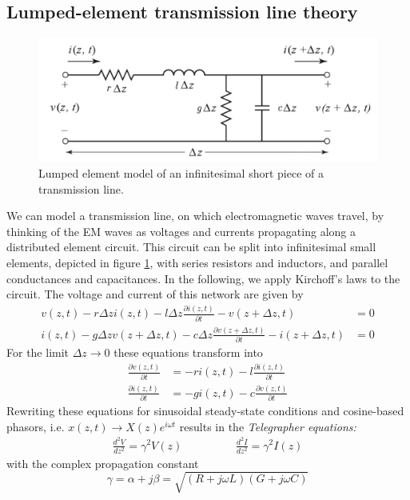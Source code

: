 \subsection{Lumped-element transmission line theory}
\begin{figure}
	\centering
	\includegraphics[width=0.4\linewidth]{chapter-theory/figs-RF/TL_lumped}
	\caption{Lumped element model of an infinitesimal short piece of a transmission line.}
	\label{fig:tllumped}
\end{figure}
We can model a transmission line, on which electromagnetic waves travel, by thinking of the EM waves as voltages and currents propagating along a distributed element circuit.
This circuit can be split into infinitesimal small elements, depicted in figure \ref{fig:tllumped}, with series resistors and inductors, and parallel conductances and capacitances.
In the following, we apply Kirchoff's laws to the circuit.
The voltage and current of this network are given by
\begin{align}
v(z,t) - r\Delta z i(z,t) - l\Delta z\frac{\partial i(z,t)}{\partial t}-v(z+\Delta z,t) &=0 \\%
i(z,t) - g\Delta z v(z+\Delta z, t) - c\Delta z\frac{\partial v(z+\Delta z,t)}{\partial t} - i(z+\Delta z,t) &=0
\end{align}
For the limit $\Delta z\rightarrow0$ these equations transform into 
\begin{align}
\frac{\partial v(z,t)}{\partial t} &= -ri(z,t)-l\frac{\partial i(z,t)}{\partial t} \\%
\frac{\partial i(z,t)}{\partial t} &= -gi(z,t)-c\frac{\partial v(z,t)}{\partial t}
\end{align}
Rewriting these equations for sinusoidal steady-state conditions and cosine-based phasors, i.e. $x(z,t) \rightarrow X(z)e^{i\omega t}$ results in the \textit{Telegrapher equations:}
\begin{align}
\frac{d^2V}{dz^2} = \gamma^2V(z) \hspace{2cm} \frac{d^2I}{dz^2} = \gamma^2I(z)
\label{eq:telegraph}
\end{align}
with the complex propagation constant
\begin{equation}
\gamma = \alpha + j\beta =\sqrt{(R+j\omega L)(G+j\omega C)}
\label{eq:gamma}
\end{equation}
